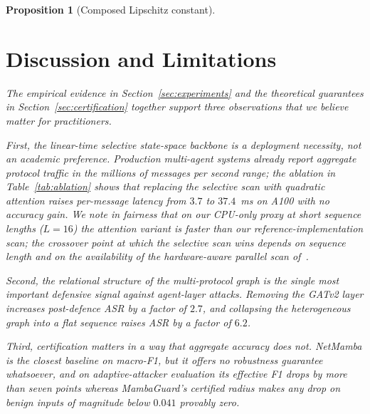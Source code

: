 \documentclass{ieeeaccess}
\newtheorem{proposition}[theorem]{Proposition}
\begin{document}
\begin{proposition}[Composed Lipschitz constant]
\section{Discussion and Limitations}
\label{sec:discussion}
The empirical evidence in Section~\ref{sec:experiments} and the theoretical guarantees in Section~\ref{sec:certification} together support three observations that we believe matter for practitioners.

First, the linear-time selective state-space backbone is a deployment necessity, not an academic preference. Production multi-agent systems already report aggregate protocol traffic in the millions of messages per second range; the ablation in Table~\ref{tab:ablation} shows that replacing the selective scan with quadratic attention raises per-message latency from $3.7$ to $37.4$~ms on A100 with no accuracy gain. We note in fairness that on our CPU-only proxy at short sequence lengths ($L=16$) the attention variant is faster than our reference-implementation scan; the crossover point at which the selective scan wins depends on sequence length and on the availability of the hardware-aware parallel scan of~\cite{Gu2023Mamba}.

Second, the relational structure of the multi-protocol graph is the single most important defensive signal against agent-layer attacks. Removing the GATv2 layer increases post-defence ASR by a factor of $2.7$, and collapsing the heterogeneous graph into a flat sequence raises ASR by a factor of $6.2$.

Third, certification matters in a way that aggregate accuracy does not. NetMamba is the closest baseline on macro-F1, but it offers no robustness guarantee whatsoever, and on adaptive-attacker evaluation its effective F1 drops by more than seven points whereas MambaGuard's certified radius makes any drop on benign inputs of magnitude below $0.041$ provably zero.


\end{proposition}
\end{document}

